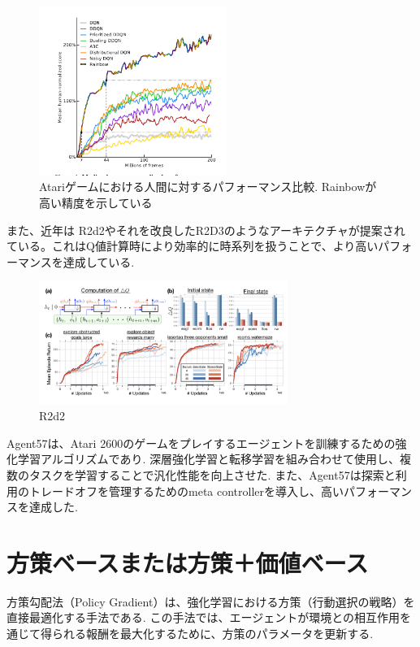 \documentclass[a4j, twocolumn, 10pt,pdflatex,ja=standard]{bxjsarticle}
\begin{document}
\begin{figure}[htbp]
  \begin{center}
  \includegraphics[height=5.5cm]{./figure/rainbow-result.png}
  \caption{Atariゲームにおける人間に対するパフォーマンス比較. Rainbowが高い精度を示している}
  \label{fig:mri}
  \end{center}
\end{figure}

\newpage


また、近年は R2d2\cite{r2d2}やそれを改良したR2D3\cite{r2d3}のようなアーキテクチャが提案されている。これはQ値計算時により効率的に時系列を扱うことで、より高いパフォーマンスを達成している.
\begin{figure}[htbp]
 \begin{center}
 \includegraphics[height=4cm]{./figure/r2d2.png}
 \caption{R2d2}
 \label{fig:mri}
 \end{center}
\end{figure}
\vspace{-9mm}

Agent57\cite{agent57}は、Atari 2600のゲームをプレイするエージェントを訓練するための強化学習アルゴリズムであり. 深層強化学習と転移学習を組み合わせて使用し、複数のタスクを学習することで汎化性能を向上させた. また、Agent57は探索と利用のトレードオフを管理するためのmeta controllerを導入し、高いパフォーマンスを達成した. 


\section{方策ベースまたは方策＋価値ベース}
方策勾配法（Policy Gradient）は、強化学習における方策（行動選択の戦略）を直接最適化する手法である. この手法では、エージェントが環境との相互作用を通じて得られる報酬を最大化するために、方策のパラメータを更新する. 
\end{document}
